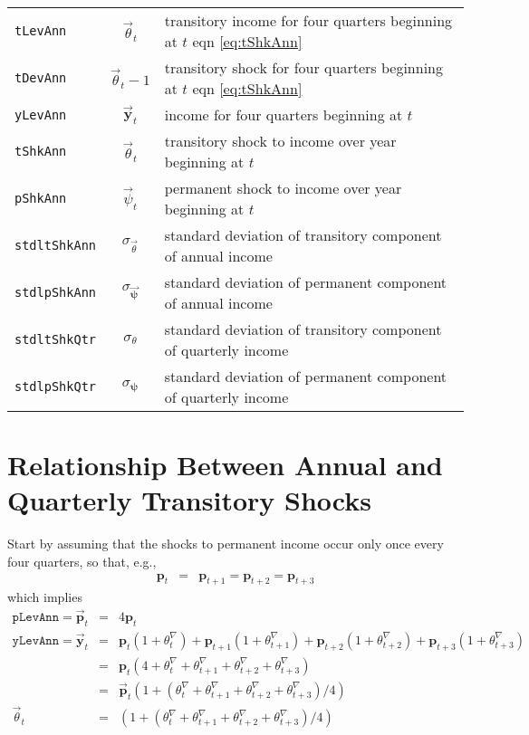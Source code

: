 \documentclass[11pt,letterpaper]{article}
\begin{document}
\begin{center}
\begin{tabular}{lcl}
\\  \texttt{tLevAnn}  & $\vec{\theta}_{t}$                & transitory income for four quarters beginning at $t$ eqn \eqref{eq:tShkAnn}
\\  \texttt{tDevAnn}  & $\vec{\theta}_{t}-1$              & transitory shock for four quarters beginning at $t$ eqn \eqref{eq:tShkAnn}
\\  \texttt{yLevAnn}  & $\vec{\mathbf{y}}_{t}$ & income for four quarters beginning at $t$
\\  \texttt{tShkAnn} & $\vec{\theta}_{t}$                  & transitory shock to income over year beginning at $t$ 
\\  \texttt{pShkAnn} & $\vec{\psi}_{t}$                  & permanent shock to income over year beginning at $t$ 
\\  \texttt{stdltShkAnn} & $\sigma_{\vec{\theta}}$ & standard deviation of transitory component of annual income
\\  \texttt{stdlpShkAnn} & $\sigma_{\vec{\mathbf{\psi}}}$ & standard deviation of permanent component of annual income
\\  \texttt{stdltShkQtr} & $\sigma_{\theta}$ & standard deviation of transitory component of quarterly income
\\  \texttt{stdlpShkQtr} & $\sigma_{\mathbf{\psi}}$ & standard deviation of permanent component of quarterly income
\end{tabular}
\end{center}

\section{Relationship Between Annual and Quarterly Transitory Shocks}

Start by assuming that the shocks to permanent income occur only once every four quarters, 
so that, e.g., 
\begin{eqnarray}
 \mathbf{p}_{t} & = & \mathbf{p}_{t+1}=\mathbf{p}_{t+2}=\mathbf{p}_{t+3} 
\end{eqnarray}
which implies
\begin{eqnarray}
   \texttt{pLevAnn} = \vec{\mathbf{p}}_{t} & = & 4\mathbf{p}_{t}  \label{eq:pLevAnn}
\\ \texttt{yLevAnn} = \vec{\mathbf{y}}_{t} & = & \mathbf{p}_{t}(1+\theta^{\nabla}_{t})+\mathbf{p}_{t+1}(1+\theta^{\nabla}_{t+1})+\mathbf{p}_{t+2}(1+\theta^{\nabla}_{t+2})+\mathbf{p}_{t+3}(1+\theta^{\nabla}_{t+3})
\\   & = & \mathbf{p}_{t}\left(4+\theta^{\nabla}_{t}+\theta^{\nabla}_{t+1}+\theta^{\nabla}_{t+2}+\theta^{\nabla}_{t+3}\right)
\\   & = & \vec{\mathbf{p}}_{t}\left(1+(\theta^{\nabla}_{t}+\theta^{\nabla}_{t+1}+\theta^{\nabla}_{t+2}+\theta^{\nabla}_{t+3})/4\right)
\\ \vec{\theta}_{t} & = & \left(1+(\theta^{\nabla}_{t}+\theta^{\nabla}_{t+1}+\theta^{\nabla}_{t+2}+\theta^{\nabla}_{t+3})/4\right) \label{eq:tShkAnn}
\end{eqnarray}
\end{document}
